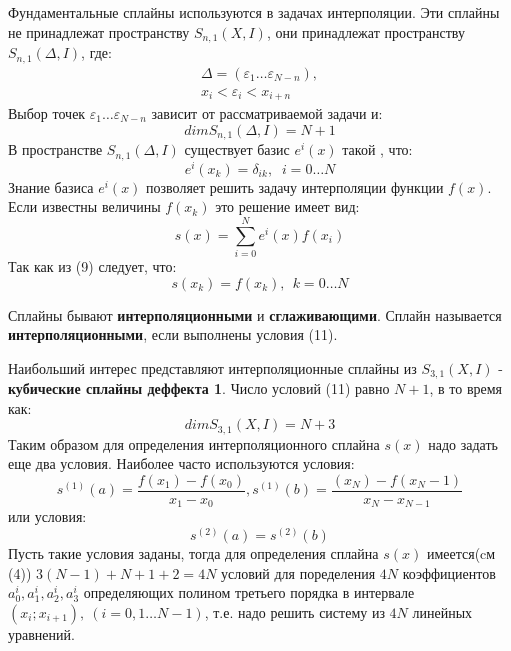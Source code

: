 Фундаментальные сплайны используются в задачах интерполяции. Эти сплайны не принадлежат пространству $S_{n,1}(X,I)$,  они принадлежат пространству $S_{n,1}(\Delta,I)$, где:
\begin{equation}
\begin{aligned}\Delta=(\varepsilon_1\ldots\varepsilon_{N-n}), \\
x_i<\varepsilon_i<x_{i+n}\end{aligned}
\end{equation}
Выбор точек $\varepsilon_1\ldots\varepsilon_{N-n}$ зависит от рассматриваемой задачи и:
\begin{equation}
dim  S_{n,1}(\Delta,I) = N+1
\end{equation}
В пространстве $S_{n,1}(\Delta,I)$ существует базис $e^i(x)$ такой , что:
\begin{equation}
e^i(x_k)=\delta_{ik},\;\; 	i=0\ldots N
\end{equation}
Знание базиса $e^i(x)$ позволяет решить задачу интерполяции функции $f(x)$. Если известны величины $f(x_k)$ это решение имеет вид:
\begin{equation}
s\left( x\right) =\sum ^{N}_{i=0}e^{i}\left( x\right) f\left( x_{i}\right)
\end{equation}
Так как из (9) следует, что:
\begin{equation}
s\left( x_k\right) =f\left( x_{k}\right),\ \  k=0\ldots N
\end{equation}

Сплайны бывают \textbf{интерполяционными} и \textbf{сглаживающими}. Сплайн называется \textbf{интерполяционными}, если выполнены условия (11).

Наибольший интерес представляют интерполяционные сплайны из $S_{3,1}(X,I)$ - \textbf{кубические сплайны деффекта 1}. Число условий (11) равно $N+1$, в то время как:
\begin{equation}
dim  S_{3,1}(X,I) = N+3
\end{equation}
Таким образом для определения интерполяционного сплайна $s(x)$ надо задать еще два условия. Наиболее часто используются условия:
\begin{equation}
s^{( 1) }(a) =\dfrac{f\left( x_{1}\right) -f\left( x_{0}\right) }{x_{1}-x_{0}},s^{\left( 1\right) }\left( b\right) =\dfrac{\left( x_{N}\right)-f( x_{N}-1)}{x_{N}-x_{N-1}}
\end{equation}
или условия:
\begin{equation}
s^{(2) }(a) =s^{(2) }(b) 
\end{equation}
Пусть такие условия заданы, тогда для определения сплайна $s(x)$ имеется(cм (4)) $3(N-1)+N+1+2=4N$ условий для поределения $4N$ коэффициентов $a^i_0,a^i_1,a^i_2,a^i_3$ определяющих полином третьего порядка в интервале $(x_i;x_{i+1}), \ (i=0,1\ldots N-1)$, т.е. надо решить систему из $4N$ линейных уравнений. 



